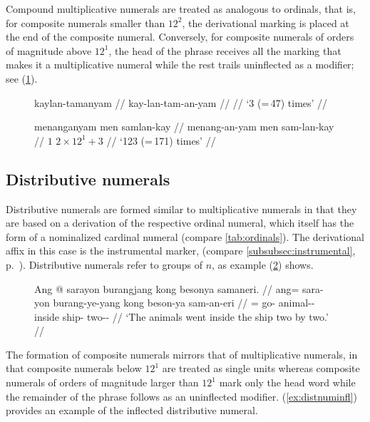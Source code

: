 Compound multiplicative numerals are treated as analogous to ordinals, that is,
for composite numerals smaller than $12^2$, the derivational marking is placed
at the end of the composite numeral. Conversely, for composite numerals of
orders of magnitude above $12^1$, the head of the phrase receives all the
marking that makes it a multiplicative numeral while the rest trails
uninflected as a modifier; see (\ref{ex:mutlnuminfl}).

\begin{figure}[h]
\pex\label{ex:mutlnuminfl}
\a\begingl
	\gla kaylan-tamanyam //
	\glb kay-lan-tam-an-yam //
	 //
	\glft `3\elv{} (=\,47) times' //
\endgl

\a\begingl
	\gla menanganyam men samlan-kay //
	\glb menang-an-yam men sam-lan-kay //
	 {$1$} {$2 \times 12^1 + 3$} //
	\glft `123 (=\,171) times' //
\endgl
\xe
\end{figure}

\subsection{Distributive numerals}

Distributive numerals are formed similar to multiplicative numerals in that
they are based on a derivation of the respective ordinal numeral, which itself
has the form of a nominalized cardinal numeral (compare
\autoref{tab:ordinals}). The derivational affix in this case is the instrumental
marker,  (compare \autoref{subsubsec:instrumental},
p.~\pageref{subsubsec:instrumental}).
Distributive numerals refer to groups of $n$, as example (\ref{ex:distnum})
shows.

\begin{figure}[h]
\ex\label{ex:distnum}
\begingl
	\gla Ang @ sarayon burangjang kong besonya samaneri. //
	\glb ang= sara-yon burang-ye-yang kong beson-ya sam-an-eri //
	\glc \AgtT{}= go-\TplN{} animal-\Pl{}-\Aarg{} inside ship-\Loc{} 
		two-\Nmlz{}-\Ins{} //
	\glft `The animals went inside the ship two by two.' //
\endgl
\xe
\end{figure}

The formation of composite numerals mirrors that of multiplicative
numerals, in that composite numerals below $12^1$ are treated as single units
whereas composite numerals of orders of magnitude larger than $12^1$ mark only
the head word while the remainder of the phrase follows as an uninflected
modifier. (\ref{ex:distnuminfl}) provides an example of the inflected
distributive numeral.

